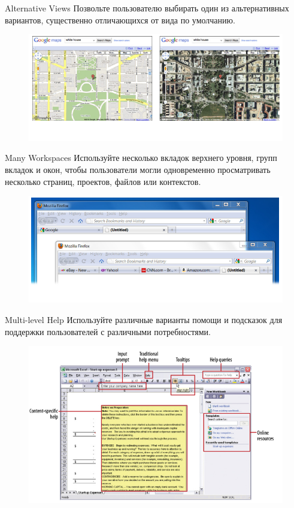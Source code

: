 \documentclass{beamer}
\begin{document}
\begin{frame}[t]{Alternative Views}
	Позвольте пользователю выбирать один из альтернативных вариантов, существенно отличающихся от вида по умолчанию.
	\begin{figure}[h]
		\centering
		\includegraphics[scale=0.6]{images/lec07-pic12.png}
	\end{figure}
\end{frame} 

\begin{frame}[t]{Many Workspaces}
	Используйте несколько вкладок верхнего уровня, групп вкладок и окон, чтобы пользователи могли одновременно просматривать несколько страниц, проектов, файлов или контекстов. 
	\begin{figure}[h]
		\centering
		\includegraphics[scale=0.6]{images/lec07-pic13.png}
	\end{figure}
\end{frame}

\begin{frame}[t]{Multi-level Help}
	Используйте различные варианты помощи и подсказок для поддержки пользователей с различными потребностями. 
	\begin{figure}[h]
		\centering
		\includegraphics[scale=0.5]{images/lec07-pic14.png}
	\end{figure}
\end{frame}
\end{document}
